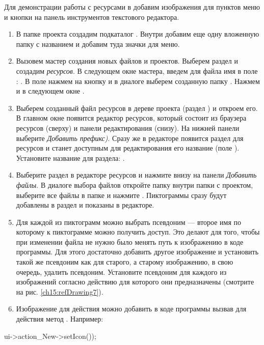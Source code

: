 Для демонстрации работы с ресурсами в  добавим изображения для пунктов меню и кнопки на панель инструментов текстового
редактора. 

\begin{enumerate}
\item В папке проекта создадим подкаталог . Внутри добавим еще одну вложенную папку с названием
 и добавим туда значки для меню. 
\item Вызовем мастер создания новых файлов и проектов. Выберем раздел  и создадим
\emph{ресурсов}\Sys{
}\Sys{)}. В следующем окне мастера, введем для файла имя в поле
: . В поле  нажмем на кнопку и в диалоге выберем созданную папку . Нажмем
 и в следующем окне . 
\item Выберем созданный файл ресурсов в дереве проекта (раздел ) и откроем его. В главном
окне  появится редактор ресурсов, который состоит из браузера ресурсов (сверху) и панели редактирования
(снизу). На нижней панели выберите \Sys{{>}}\emph{Добавить префикс)}. Сразу же
в редакторе появится раздел для ресурсов и станет доступным для редактирования его название (поле
). Установите название для раздела: . 
\item Выберите раздел  в редакторе ресурсов и нажмите внизу на панели
\Sys{{>}}\emph{Д}\emph{обавить
файлы}\Sys{)}. В диалоге выбора файлов откройте папку  внутри папки с
проектом, выберите все файлы в папке и нажмите . Пиктограммы сразу будут добавлены в раздел и
показаны в редакторе. 
\item Для каждой из пиктограмм можно выбрать псевдоним --- второе имя по которому к пиктограмме можно получить доступ. Это
делают для того, чтобы при изменении файла не нужно было менять путь к изображению в коде программы. Для этого
достаточно добавить другое изображение и установить такой же псевдоним как для старого, а старому изображению, в свою
очередь, удалить псевдоним. Установите псевдоним для каждого из изображений согласно действию для которого они
предназначены (смотрите на рис. \ref{ch15:refDrawing7}).
\item Изображение для действия можно добавить в коде программы вызвав для действия метод
. Например: 
\end{enumerate}
ui-{>}action\_New-{>}setIcon());



